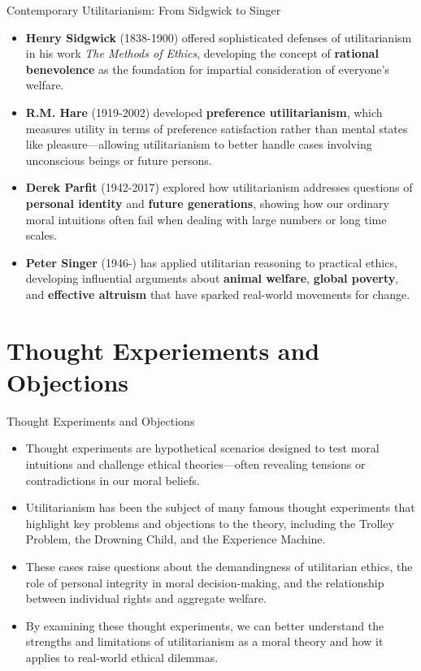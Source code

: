 \documentclass[aspectratio=169]{beamer}
\begin{document}
\begin{frame}{Contemporary Utilitarianism: From Sidgwick to Singer}
    \begin{itemize}
        \item \textbf{Henry Sidgwick} (1838-1900) offered sophisticated defenses of utilitarianism in his work \textit{The Methods of Ethics}, developing the concept of \textbf{rational benevolence} as the foundation for impartial consideration of everyone's welfare.
        
        \item \textbf{R.M. Hare} (1919-2002) developed \textbf{preference utilitarianism}, which measures utility in terms of preference satisfaction rather than mental states like pleasure—allowing utilitarianism to better handle cases involving unconscious beings or future persons.
        
        \item \textbf{Derek Parfit} (1942-2017) explored how utilitarianism addresses questions of \textbf{personal identity} and \textbf{future generations}, showing how our ordinary moral intuitions often fail when dealing with large numbers or long time scales.
        
        \item \textbf{Peter Singer} (1946-) has applied utilitarian reasoning to practical ethics, developing influential arguments about \textbf{animal welfare}, \textbf{global poverty}, and \textbf{effective altruism} that have sparked real-world movements for change.
    \end{itemize}
\end{frame}

\section{Thought Experiements and Objections}
\begin{frame}{Thought Experiments and Objections}
    \begin{itemize}
        \item Thought experiments are hypothetical scenarios designed to test moral intuitions and challenge ethical theories—often revealing tensions or contradictions in our moral beliefs.
        
        \item Utilitarianism has been the subject of many famous thought experiments that highlight key problems and objections to the theory, including the Trolley Problem, the Drowning Child, and the Experience Machine.
        
        \item These cases raise questions about the demandingness of utilitarian ethics, the role of personal integrity in moral decision-making, and the relationship between individual rights and aggregate welfare.
        
        \item By examining these thought experiments, we can better understand the strengths and limitations of utilitarianism as a moral theory and how it applies to real-world ethical dilemmas.
    \end{itemize}
\end{frame}
\end{document}
